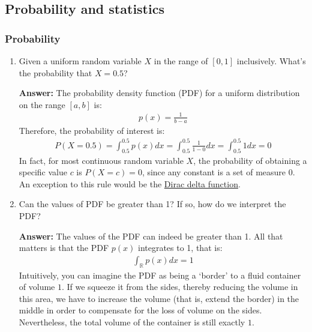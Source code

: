 \documentclass{article}
\newenvironment{QandA}{\begin{enumerate}[label=\arabic*.]}{\end{enumerate}}
\newenvironment{answer}{\par\normalfont \textbf{Answer:}}{}
\newcommand{\R}{\mathbb{R}}
\begin{document}
\subsection{Probability and statistics}
\subsubsection{Probability}

\begin{QandA}
    \item Given a uniform random variable $X$ in the range of $\left[ 0, 1 \right]$ inclusively. What's the probability that $X = 0.5$?
    \begin{answer}
        The probability density function (PDF) for a uniform distribution on the range $\left[a, b\right]$ is:
        \begin{align*}
            p(x) = \frac{1}{b-a}
        \end{align*}
        Therefore, the probability of interest is:
        \begin{align*}
            P(X=0.5) = \int_{0.5}^{0.5} p(x) dx = \int_{0.5}^{0.5} \frac{1}{1-0}dx = \int_{0.5}^{0.5} 1dx = 0
        \end{align*}
        In fact, for most continuous random variable $X$, the probability of obtaining a specific value $c$ is $P(X=c)=0$, since any constant is a set of measure $0$. An exception to this rule would be the \href{https://en.wikipedia.org/wiki/Dirac_delta_function}{Dirac delta function}.
    \end{answer}

    \item Can the values of PDF be greater than 1? If so, how do we interpret the PDF?
    \begin{answer}
        The values of the PDF can indeed be greater than 1. All that matters is that the PDF $p(x)$ integrates to 1, that is:
        \begin{align*}
            \int_{\R} p(x)dx = 1
        \end{align*}
        Intuitively, you can imagine the PDF as being a `border' to a fluid container of volume $1$. If we squeeze it from the sides, thereby reducing the volume in this area, we have to increase the volume (that is, extend the border) in the middle in order to compensate for the loss of volume on the sides. Nevertheless, the total volume of the container is still exactly $1$.
    \end{answer}
    

\end{QandA}
\end{document}
